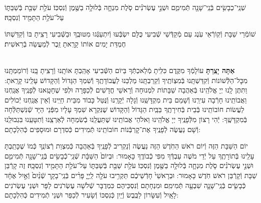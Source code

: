 \documentclass[twoside, openany, parskip=half, 11pt]{book}
\begin{document}
שְׁנֵֽי־כְבָשִׂ֥ים בְּֿנֵֽי־שָׁנָ֖ה תְּֿמִימִ֑ם וּשְׁנֵ֣י עֶשְׂרֹנִ֗ים סֹ֧לֶת מִנְחָ֛ה בְּֿלוּלָ֥ה בַשֶּׁ֖מֶן וְֿנִסְכּֽוֹ׃ עֹלַ֥ת שַׁבַּ֖ת בְּֿשַׁבַּתּ֑וֹ עַל־עֹלַ֥ת הַתָּמִ֖יד וְֿנִסְכָּֽהּ׃

 שׁוֹמְֿרֵי שַׁבָּת וְֿקֽוֹרְֿאֵי עֹֽנֶג עַם מְֿקַדְּֿשֵׁי שְֿׁבִיעִי כֻּלָּם יִשְׂבְּֿעוּ וְֿיִתְעַנְּֿגוּ מִטּוּבֶֽךָ וּבַשְּֿׁבִיעִי רָצִֽיתָ בּוֹ וְֿקִדַּשְׁתּוֹ חֶמְדַּת יָמִים אוֹתוֹ קָרָֽאתָ זֵֽכֶר לְֿמַעֲשֵׂה בְֿרֵאשִׁית׃

\shabboskiddushhayom{} 

\begin{sometimes}

\label{shabbosroshchodesh}
\\
\textbf{אַתָּה יָצַֽרְתָּ}
 עוֹלָמְֿךָ מִקֶּֽדֶם כִּלִּֽיתָ מְֿלַאכְתְּֿךָ בַּיוֹם הַשְּֿֿׁבִיעִי אָהַֽבְתָּ אוֹתָֽנוּ וְֿרָצִֽיתָ בָּֽנוּ וְֿרוֹמַמְתָּֽנוּ מִכׇּל־הַלְּֿשׁוֹנוֹת וְֿקִדַּשְׁתָּֽנוּ בְּֿמִצְוֹתֶֽיךָ וְֿקֵרַבְתָּֽנוּ מַלְכֵּנוּ לַעֲבוֹדָתֶֽךָ וְֿשִׁמְךָ הַגָּדוֹל וְֿהַקָּדוֹשׁ עָלֵֽינוּ קָרָֽאתָ: וַתִּתֶּן לָֽנוּ יְיָ אֱלֹהֵֽינוּ בְּֿאַהֲבָה שַׁבָּתוֹת לִמְנוּחָה וְֿרָאשֵׁי חֳדָשִׁים לְֿכַפָּרָה וּלְפִי שֶׁחָטָֽאנוּ לְֿפָנֶֽיךָ אֲנַֽחְנוּ וַאֲבוֹתֵֽינוּ חָרְֿבָה עִירֵֽנוּ וְֿשָׁמֵם בֵּית מִקְדָּשֵֽׁנוּ וְֿגָלָה יְֿקָרֵֽנוּ וְֿנֻּטַּל כָּבוֹד מִבֵּית חַיֵּֽינוּ וְֿאֵין אֲנַֽחְנוּ יְֿכוֹלִים לַעֲשׂוֹת חוֹבוֹתֵֽינוּ בְּֿבֵית בְּֿחִירָתֶֽךָ בַּבַּֽיִת הַגָּדוֹל וְֿהַקָּדוֹשׁ שֶׁנִּקְרָא שִׁמְךָ עָלָיו מִפְּֿנֵי הַיָּד שְֿׁנִּשְׁתַּלְּֿחָה בְּֿמִקְדָּשֶֽׁךָ: יְֿהִי רָצוֹן מִלְּֿפָנֶֽיךָ יְיָ אֱלֹהֵֽינוּ וֵאלֹהֵי אֲבוֹתֵֽינוּ שֶׁתַּעֲלֵֽנוּ בְֿשִׂמְחָה לְֿאַרְצֵֽנוּ וְֿתִטָּעֵֽנוּ בִּגְבוּלֵֽנוּ וְֿשָׁם נַעֲשֶׂה לְֿפָנֶֽיךָ אֶת־קׇרְבְּֿנוֹת חוֹבוֹתֵֽינוּ תְּֿמִידִים כְּֿסִדְרָם וּמוּסָפִים כְּֿהִלְכָתָם:

 יוֹם הַשַּׁבָּת הַזֶּה וְֿיוֹם רֹאשׁ הַחֹֽדֶשׁ הַזֶּה נַעֲשֶׂה וְֿנַקְרִיב לְֿפָנֶֽיךָ בְּֿאַהֲבָה כְּֿמִצְוַת רְֿצוֹנֶֽךָ כְּֿמוֹ שֶׁכָּתַֽבְתָּ עָלֵֽינוּ בְּֿתוֹרָתֶֽךָ עַל יְֿדֵי מֹשֶׁה עַבְדְּֿךָ מִפִּי כְֿבוֹדֶֽךָ כָּאָמוּר: וּבְיוֹם֙ הַשַּׁבָּ֔ת שְֿׁנֵֽי־כְֿֿבָשִׂ֥ים בְּֿנֵֽי־שָׁנָ֖ה תְּֿמִימִ֑ם וּשְׁנֵ֣י עֶשְׂרֹנִ֗ים סֹ֧לֶת מִנְחָ֛ה בְּֿלוּלָ֥ה בַשֶּׁ֖מֶן וְֿנִסְכּֽוֹ׃ עֹלַ֥ת שַׁבַּ֖ת בְּֿשַׁבַּתּ֑וֹ עַל־עֹלַ֥ת הַתָּמִ֖יד וְֿנִסְכָּֽהּ׃ זֶה קָרְֿבַּן שַׁבָּת וְֿקָרְֿבַּן רֹאשׁ חֹֽדֶשׁ כָּאָמוּר: וּבְרָאשֵׁי֙ חָדְֿשֵׁיכֶ֔ם תַּקְרִ֥יבוּ עֹלָ֖ה לַֽיְיָ֑ פָּרִ֨ים בְּֿנֵֽי־בָקָ֤ר שְֿׁנַ֨יִם֙ וְֿאַ֣יִל אֶחָ֔ד כְּֿבָשִׂ֧ים בְּֿנֵֽי־שָׁנָ֛ה שִׁבְעָ֖ה תְּֿמִימִֽם׃ וּמִנְחָתָם וְֿנִסְכֵּיהֶם כִּמְדֻבָּר שְֿׁלֹשָׁה עֶשְׂרֹנִים לַפָּר וּשְׁנֵי עֶשְׂרֹנִים לָאָֽיִל וְֿעִשָּׂרוֹן לַכֶּֽבֶשׂ וְֿיַֽיִן כְּֿנִסְכּוֹ וְֿשָׂעִיר לְֿכַפֵּר וּשְׁנֵי תְֿמִידִים כְּֿהִלְכָתָם:


\end{sometimes}
\end{document}
